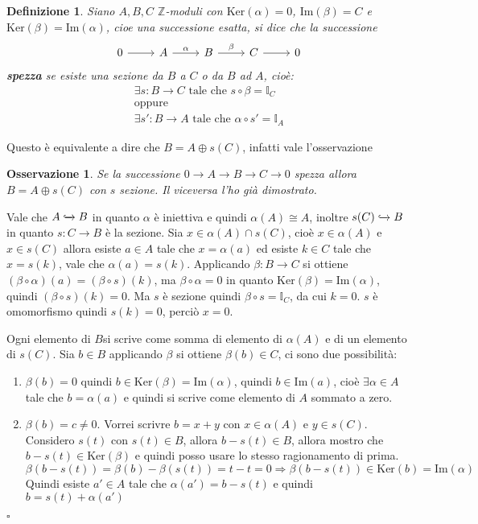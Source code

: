 \documentclass[10pt, twoside=false, x11names]{scrbook}
\newtheorem{osservation}[theorem]{Osservazione}
\newtheorem{definition}[theorem]{Definizione}
\newenvironment{proof}{{\textbf{Dimostrazione}:}}{\hfill $\square$}
\newcommand{\Z}{\mathbb{Z}}
\newcommand{\im}[1]{\mathrm{Im}( #1 )}
\renewcommand{\ker}[1]{\mathrm{Ker}( #1)}
\newcommand{\Id}[1][]{\mathbb{I}_#1}
\newcommand{\incl}{\xhookrightarrow{}}
\begin{document}
\begin{definition}
  Siano $ A, B, C $ $ \Z $-moduli con $ \ker{\alpha} = 0 $, $ \im{\beta} = C$ e $ \ker{\beta} = \im{\alpha} $,
  cioe una successione esatta, si dice che la successione
  \[
    \begin{tikzcd}
      0 \arrow{r}{} & A \arrow{r}{\alpha} & B \arrow{r}{\beta} & C \arrow{r}{} & 0
    \end{tikzcd}
  \]
  \textbf{spezza} se esiste una sezione da $ B $ a $ C $
  o da $ B $ ad $ A $, cioè:
  \begin{gather*}
    \exists s \colon B \to C \text{ tale che } s \circ \beta = \Id{C} \\
    \text{oppure} \\
    \exists s' \colon B \to A \text{ tale che } \alpha \circ s' = \Id{A}
  \end{gather*}
\end{definition}

Questo è equivalente a dire che $ B = A \oplus s(C) $, infatti vale l'osservazione
\begin{osservation}
  Se la successione $ 0 \to A \to B \to C \to 0 $ spezza allora $ B = A \oplus s(C) $ con $ s $ sezione.
  Il viceversa l'ho già dimostrato.
\end{osservation}
\begin{proof}
  Vale che $ A \incl B $ in quanto $ \alpha $ è iniettiva e quindi $ \alpha(A) \cong A $, inoltre
  $ s(C) \incl B $ in quanto $ s \colon C \to B $ è la sezione.
  Sia $ x \in \alpha(A) \cap s(C) $, cioè $ x \in \alpha(A) $ e $ x \in s(C) $ allora
  esiste $ a \in A $ tale che $ x = \alpha(a) $ ed esiste $ k \in C $ tale che
  $ x = s(k) $, vale che $ \alpha(a) = s(k) $. Applicando $ \beta \colon B \to C $ si ottiene
  $ (\beta \circ \alpha) (a) = (\beta \circ s)(k) $, ma $ \beta \circ \alpha = 0$ in quanto $ \ker{\beta} = \im{\alpha} $, quindi
  $ (\beta \circ s)(k) = 0 $. Ma $ s $ è sezione quindi $ \beta \circ s = \Id{C} $, da cui $ k = 0 $.
  $ s $ è omomorfismo quindi $ s(k) = 0 $, perciò $ x = 0 $.

  Ogni elemento di $ B $si scrive come somma di elemento di $ \alpha(A) $ e di un elemento
  di $ s(C) $. Sia $ b \in B $ applicando $ \beta $ si ottiene $ \beta(b) \in C $, ci sono due
  possibilità:
  \begin{enumerate}
  \item $ \beta(b) = 0 $ quindi $ b \in \ker{\beta} = \im{\alpha} $, quindi $ b \in \im{a} $, cioè
    $ \exists \alpha \in A $ tale che $ b = \alpha(a) $ e quindi si scrive come elemento di $ A $ sommato
    a zero.
  \item $ \beta(b) = c \not = 0 $. Vorrei scrivre $ b = x + y $ con $ x \in \alpha(A) $ e $ y \in s(C) $.
    Considero $ s(t) $ con $ s(t) \in B $, allora $ b - s(t) \in B $, allora
    mostro che $ b - s(t) \in \ker{\beta} $ e quindi posso usare lo stesso ragionamento
    di prima.
    \[
      \beta(b - s(t)) = \beta(b) - \beta(s(t)) = t - t = 0 \Rightarrow \beta(b - s(t)) \in \ker{b} = \im{\alpha}
    \]
    Quindi esiste $ a' \in A $ tale che $ \alpha(a') = b - s(t) $ e quindi $ b = s(t) + \alpha(a') $
  \end{enumerate}
\end{proof}
\end{document}

